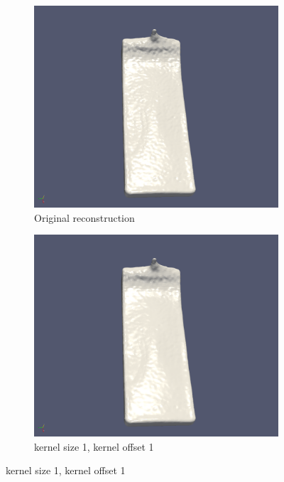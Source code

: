 \begin{figure}
        \begin{subfigure}[b]{0.5\textwidth}
               \includegraphics[width=\textwidth]{figures/DBBlur_ks-0_ko-0.png}
               \caption{Original reconstruction}
               \label{fig:kskdOrig}
        \end{subfigure}
        \begin{subfigure}[b]{0.5\textwidth}
               \includegraphics[width=\textwidth]{figures/DBBlur_ks-1_ko-1.png}
               \caption{kernel size 1, kernel offset 1}

\end{subfigure}
\end{figure}
